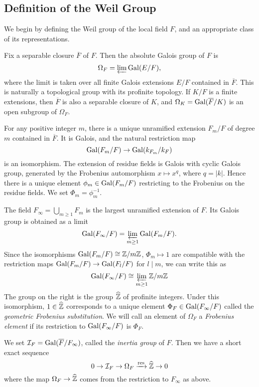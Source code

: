 \subsection{Definition of the Weil Group}
We begin by defining the Weil group of the local field $F$, and an appropriate class of its representations.

Fix a separable closure $\overline{F}$ of $F$. Then the absolute Galois group of $F$ is
\[\Omega_F = \varprojlim\mathrm{Gal}(E/F),\]
where the limit is taken over all finite Galois extensions $E/F$ contained in $\overline{F}$. This is naturally a topological group with its profinite topology. If $K/F$ is a finite extensions, then $\overline{F}$ is also a separable closure of $K$, and $\Omega_K = \mathrm{Gal}(\overline{F}/K)$ is an open subgroup of $\Omega_F$.

For any positive integer $m$, there is a unique unramified extension $F_m/F$ of degree $m$ contained in $\overline{F}$. It is Galois, and the natural restriction map
\[\mathrm{Gal}(F_m/F)\to \mathrm{Gal}(k_{F_m}/k_F)\]
is an isomorphism. The extension of residue fields is Galois with cyclic Galois group, generated by the Frobenius automorphism $x\mapsto x^q$, where $q = |k|$. Hence there is a unique element $\phi_m\in \mathrm{Gal}(F_m/F)$ restricting to the Frobenius on the residue fields. We set $\Phi_m = \phi_m^{-1}$.

The field $F_\infty = \bigcup_{m\ge1} F_m$ is the largest unramified extension of $F$. Its Galois group is obtained as a limit
\[\mathrm{Gal}(F_\infty/F) = \varprojlim_{m\ge 1}\mathrm{Gal}(F_m/F).\]
Since the isomorphisms $\mathrm{Gal}(F_m/F)\cong \mathbb{Z}/m\mathbb{Z}$, $\Phi_m\mapsto 1$ are compatible with the restriction maps $\mathrm{Gal}(F_m/F)\to\mathrm{Gal}(F_l/F)$ for $l\mid m$, we can write this as
\[\mathrm{Gal}(F_\infty/F)\cong \varprojlim_{m\ge 1} \mathbb{Z}/m\mathbb{Z}\]
The group on the right is the group $\widehat{\mathbb{Z}}$ of profinite integers. Under this isomorphism, $1\in \widehat{\mathbb{Z}}$ corresponds to a unique element $\Phi_F\in \mathrm{Gal}(F_\infty/F)$ called the \emph{geometric Frobenius substitution}. We will call an element of $\Omega_F$ a \emph{Frobenius element} if its restriction to $\mathrm{Gal}(F_\infty/F)$ is $\Phi_F$. 

We set $\mathcal{I}_F = \mathrm{Gal}(\overline{F}/F_\infty)$, called the \emph{inertia group} of $F$. Then we have a short exact sequence
\[0 \to \mathcal{I}_F\to \Omega_F \xrightarrow{\text{res}} \widehat{\mathbb{Z}}\to 0\]
where the map $\Omega_F\to \widehat{\mathbb{Z}}$ comes from the restriction to $F_\infty$ as above.

